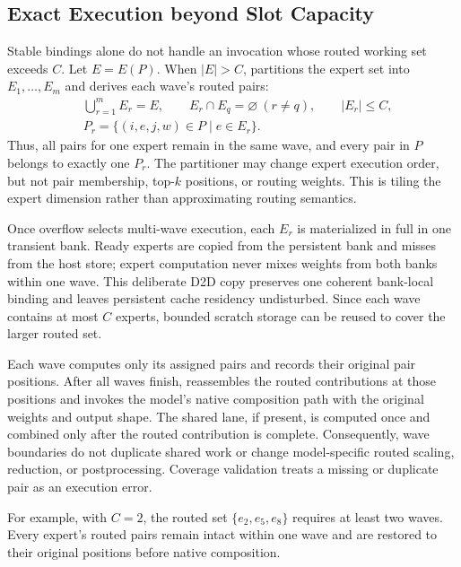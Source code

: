 \subsection{Exact Execution beyond Slot Capacity}
\label{sec:design-waves}

Stable bindings alone do not handle an invocation whose routed working set
exceeds $C$. Let $E=E(P)$. When $|E|>C$, \system partitions the expert set into
$E_1,\ldots,E_m$ and derives each wave's routed pairs:
\begin{equation}
\begin{aligned}
  &\bigcup_{r=1}^{m} E_r=E, \qquad
  E_r\cap E_q=\varnothing\ (r\ne q), \qquad |E_r|\le C,\\
  &P_r=\{(i,e,j,w)\in P\mid e\in E_r\}.
\end{aligned}
\end{equation}
Thus, all pairs for one expert remain in the same wave, and every pair in $P$
belongs to exactly one $P_r$. The partitioner may change expert execution
order, but not pair membership, top-$k$ positions, or routing weights. This is
tiling the expert dimension rather than approximating routing semantics.

Once overflow selects multi-wave execution, each $E_r$ is materialized in full
in one transient bank. Ready experts are copied from the persistent bank and
misses from the host store; expert computation never mixes weights from both
banks within one wave. This deliberate D2D copy preserves one coherent
bank-local binding and leaves persistent cache residency undisturbed. Since
each wave contains at most $C$ experts, bounded scratch storage can be reused
to cover the larger routed set.

Each wave computes only its assigned pairs and records their original pair
positions. After all waves finish, \system reassembles the routed contributions
at those positions and invokes the model's native composition path with the
original weights and output shape. The shared lane, if present, is computed
once and combined only after the routed contribution is complete. Consequently,
wave boundaries do not duplicate shared work or change model-specific routed
scaling, reduction, or postprocessing. Coverage validation treats a missing or
duplicate pair as an execution error.

For example, with $C=2$, the routed set $\{e_2,e_5,e_8\}$ requires at least
two waves. Every expert's routed pairs remain intact within one wave and are
restored to their original positions before native composition.

